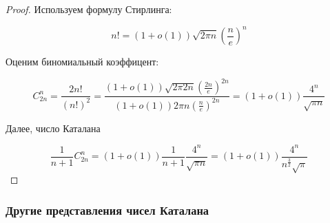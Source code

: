 \begin{proof}
    
    Используем формулу Стирлинга:

    \[ n! = (1 + o(1)) \sqrt{2 \pi n} \left( \frac{n}{e} \right)^n \]

    Оценим биномиальный коэффицент:

    \[ C_{2n}^n = \frac{2n!}{(n!)^2} = \frac{ (1 + o(1)) \sqrt{2 \pi 2 n} \left( \frac{2n}{e} \right)^{2n}}{ (1 + o(1)) 2 \pi n \left( \frac{n}{e} \right)^{2n}} = (1 + o(1)) \frac{4^n}{\sqrt{\pi n}} \]

    Далее, число Каталана

    \[ \frac{1}{n + 1} C_{2n}^n = (1 + o(1)) \frac{1}{n + 1} \frac{4^n}{\sqrt{\pi n}} = (1 + o(1)) \frac{4^n}{n^{\frac{3}{2}} \sqrt{\pi}} \]

\end{proof}

\subsubsection*{Другие представления чисел Каталана}

